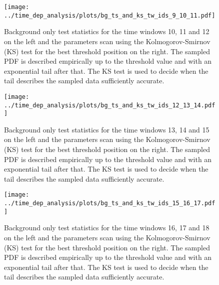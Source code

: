 \begin{figure}[H]
  \centering
  \texttt{[image: ../time\_dep\_analysis/plots/bg\_ts\_and\_ks\_tw\_ids\_9\_10\_11.pdf]}
  \caption[Background test statistics for the time windows 10, 11 and 12]{
    Background only test statistics for the time windows 10, 11 and 12 on the left and the parameters scan using the Kolmogorov-Smirnov (KS) test for the best threshold position on the right.
    The sampled PDF is described empirically up to the threshold value and with an exponential tail after that.
    The KS test is used to decide when the tail describes the sampled data sufficiently accurate.
  }
  \label{fig:bg_ts_and_ks_tw_ids_9_10_11}
\end{figure}

\begin{figure}[H]
  \centering
  \texttt{[image: ../time\_dep\_analysis/plots/bg\_ts\_and\_ks\_tw\_ids\_12\_13\_14.pdf]}
  \caption[Background test statistics for the time windows 13, 14 and 15]{
    Background only test statistics for the time windows 13, 14 and 15 on the left and the parameters scan using the Kolmogorov-Smirnov (KS) test for the best threshold position on the right.
    The sampled PDF is described empirically up to the threshold value and with an exponential tail after that.
    The KS test is used to decide when the tail describes the sampled data sufficiently accurate.
  }
  \label{fig:bg_ts_and_ks_tw_ids_12_13_14}
\end{figure}

\begin{figure}[H]
  \centering
  \texttt{[image: ../time\_dep\_analysis/plots/bg\_ts\_and\_ks\_tw\_ids\_15\_16\_17.pdf]}
  \caption[Background test statistics for the time windows 16, 17 and 18]{
    Background only test statistics for the time windows 16, 17 and 18 on the left and the parameters scan using the Kolmogorov-Smirnov (KS) test for the best threshold position on the right.
    The sampled PDF is described empirically up to the threshold value and with an exponential tail after that.
    The KS test is used to decide when the tail describes the sampled data sufficiently accurate.
  }
  \label{fig:bg_ts_and_ks_tw_ids_15_16_17}
\end{figure}

